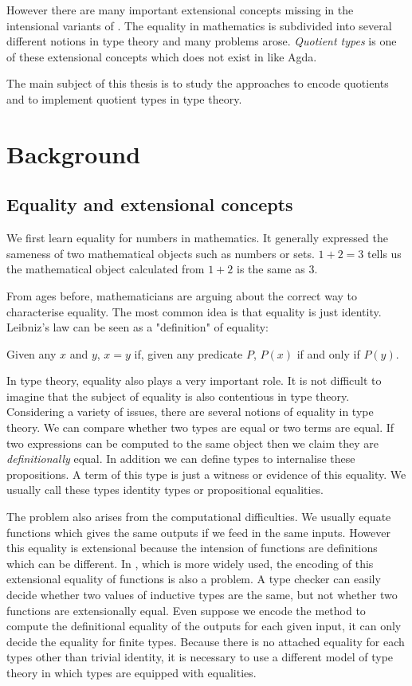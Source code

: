 However there are many important extensional concepts missing in the
intensional variants of \mltt. The equality in mathematics is
subdivided into several different notions in type theory and many
problems arose.
\emph{Quotient types} is one of these extensional
concepts which does not exist in \itt like Agda. 

The main subject of this thesis is to study the approaches to encode
quotients and to implement quotient types in type theory.

\section{Background}

\subsection{Equality and extensional concepts}

We first learn equality for numbers in mathematics. It generally
expressed the sameness of two mathematical objects such as numbers or sets.
$1+2=3$ tells us the mathematical object calculated from $1+2$ is the
same as $3$.

From ages before, mathematicians are arguing about the correct way to
characterise equality. The most common idea is that equality is just
identity. Leibniz's law can be seen as a "definition" of
equality:

Given any $x$ and $y$, $x = y$ if, given any predicate $P$, $P(x)$ if and only
if $P(y)$.

In type theory, equality also plays a very important role.
It is not difficult to imagine that the subject of equality is also
contentious in type theory. Considering a variety of issues, there are
several notions of equality in type theory.
We can compare whether two types are equal or two terms are equal. If two
expressions can be computed to the same object then we claim they are
 \emph{definitionally} equal.  In addition we can define types to
 internalise these propositions. A term of this type is just a witness or evidence of
 this equality. We usually call these types identity types or
 propositional equalities.

The problem also arises from the computational difficulties. We
usually equate functions which gives the same outputs if we feed in the
same inputs. However this equality is extensional because the intension
of functions are definitions which can be different. In \itt, which is
more widely used, the encoding of this extensional equality of
functions is also a problem. A type checker can easily decide whether two
values of inductive types are the same, but not whether two functions
are extensionally equal. Even suppose we encode the method to compute
the definitional equality of the outputs for each given input, it can
only decide the equality for finite types. Because there is no
attached equality for each types other than trivial identity, it is
necessary to use a different model of type theory in which types are
equipped with equalities.

